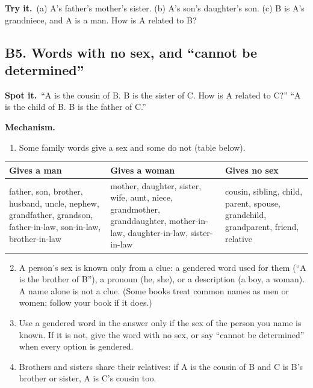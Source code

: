 \documentclass[11pt,a4paper]{article}
\let\oldsubsection\subsection
\renewcommand{\subsection}{\needspace{9\baselineskip}\oldsubsection}
\newcommand{\spot}{\textbf{\color{ember}Spot it.}\ }
\newcommand{\mech}{\textbf{\color{ember}Mechanism.}\ }
\newcommand{\tryit}[1]{\textbf{\color{ember}Try it.}\ #1}
\begin{document}
\tryit (a) A's father's mother's sister. (b) A's son's daughter's son. (c) B is A's grandniece, and A is a man. How is A related to B?

\subsection{B5. Words with no sex, and ``cannot be determined''}
\spot ``A is the cousin of B. B is the sister of C. How is A related to C?'' ``A is the child of B. B is the father of C.''

\mech
\begin{enumerate}
\item Some family words give a sex and some do not (table below).
\end{enumerate}
\begin{center}\small\renewcommand{\arraystretch}{1.18}\setlength{\tabcolsep}{7pt}
\begin{tabularx}{\linewidth}{@{}>{\raggedright\arraybackslash}X >{\raggedright\arraybackslash}X >{\raggedright\arraybackslash}X@{}}
\toprule
\textbf{\color{slate}Gives a man} & \textbf{\color{slate}Gives a woman} & \textbf{\color{slate}Gives no sex} \\ \midrule
father, son, brother, husband, uncle, nephew, grandfather, grandson, father-in-law, son-in-law, brother-in-law & mother, daughter, sister, wife, aunt, niece, grandmother, granddaughter, mother-in-law, daughter-in-law, sister-in-law & cousin, sibling, child, parent, spouse, grandchild, grandparent, friend, relative \\
\bottomrule
\end{tabularx}\end{center}
\begin{enumerate}
\setcounter{enumi}{1}
\item A person's sex is known only from a clue: a gendered word used for them (``A is the brother of B''), a pronoun (he, she), or a description (a boy, a woman). A name alone is not a clue. (Some books treat common names as men or women; follow your book if it does.)
\item Use a gendered word in the answer only if the sex of the person you name is known. If it is not, give the word with no sex, or say ``cannot be determined'' when every option is gendered.
\item Brothers and sisters share their relatives: if A is the cousin of B and C is B's brother or sister, A is C's cousin too.
\end{enumerate}
\end{document}

